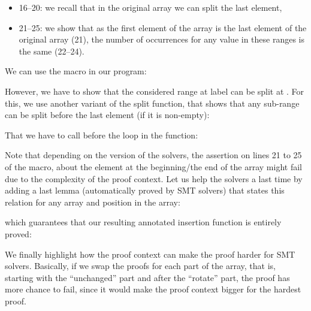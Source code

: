\begin{itemize}
\item 16--20: we recall that in the original array we can split the last
  element,
\item 21--25: we show that as the first element of the array is
  the last element of the original array (21), the number of occurrences for
  any value in these ranges is the same (22--24).
\end{itemize}


We can use the macro in our program:




However, we have to show that the considered range at label  can
be split at . For this, we use another variant of the split
function, that shows that any sub-range can be split before the last element (if
it is non-empty):






That we have to call before the loop in the  function:




Note that depending on the version of the solvers, the assertion on lines 21 to
25 of the macro, about the element at the beginning/the end of the array might
fail due to the complexity of the proof context. Let us help the solvers a last
time by adding a last lemma (automatically proved by SMT solvers) that states
this relation for any array and position in the array:





which guarantees that our resulting annotated insertion function is entirely
proved:




We finally highlight how the proof context can make the proof harder for SMT
solvers. Basically, if we swap the proofs for each part of the array, that is,
starting with the ``unchanged'' part and after the ``rotate'' part, the proof has
more chance to fail, since it would make the proof context bigger for the
hardest proof.






